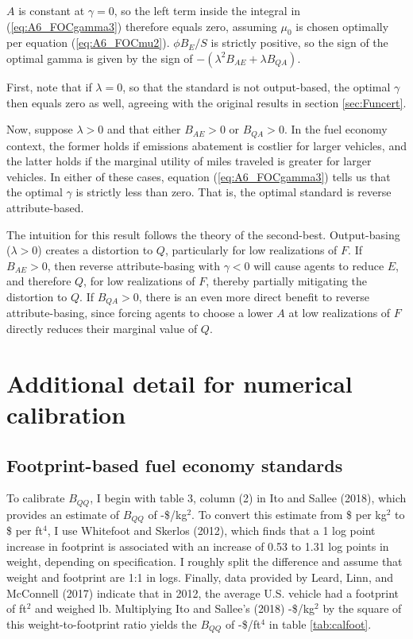 \documentclass[12pt]{article}
\begin{document}
$A$ is constant at $\gamma=0$, so the left term inside the integral in (\ref{eq:A6_FOCgamma3}) therefore equals zero, assuming $\mu_0$ is chosen optimally per equation (\ref{eq:A6_FOCmu2}). $\phi B_E / S$ is strictly positive, so the sign of the optimal gamma is given by the sign of $-(\lambda^2B_{AE}+\lambda B_{QA})$.

First, note that if $\lambda=0$, so that the standard is not output-based, the optimal $\gamma$ then equals zero as well, agreeing with the original results in section \ref{sec:Funcert}.

Now, suppose $\lambda>0$ and that either $B_{AE}>0$ or $B_{QA}>0$. In the fuel economy context, the former holds if emissions abatement is costlier for larger vehicles, and the latter holds if the marginal utility of miles traveled is greater for larger vehicles. In either of these cases, equation (\ref{eq:A6_FOCgamma3}) tells us that the optimal $\gamma$ is strictly less than zero. That is, the optimal standard is reverse attribute-based.

The intuition for this result follows the theory of the second-best. Output-basing ($\lambda>0$) creates a distortion to $Q$, particularly for low realizations of $F$. If $B_{AE}>0$, then reverse attribute-basing with $\gamma<0$ will cause agents to reduce $E$, and therefore $Q$, for low realizations of $F$, thereby partially mitigating the distortion to $Q$. If $B_{QA}>0$, there is an even more direct benefit to reverse attribute-basing, since forcing agents to choose a lower $A$ at low realizations of $F$ directly reduces their marginal value of $Q$.





\newpage
\section{Additional detail for numerical calibration} \label{appx:cal}

\subsection{Footprint-based fuel economy standards} \label{appx:foot}

To calibrate $B_{QQ}$, I begin with table 3, column (2) in Ito and Sallee (2018), which provides an estimate of $B_{QQ}$ of -\$\unskip /kg$^2$. To convert this estimate from \$ per kg$^2$ to \$ per ft$^4$, I use Whitefoot and Skerlos (2012), which finds that a 1 log point increase in footprint is associated with an increase of 0.53 to 1.31 log points in weight, depending on specification. I roughly split the difference and assume that weight and footprint are 1:1 in logs. Finally, data provided by Leard, Linn, and McConnell (2017) indicate that in 2012, the average U.S. vehicle had a footprint of ft$^2$ and weighed lb. Multiplying Ito and Sallee's (2018) -\$\unskip /kg$^2$ by the square of this weight-to-footprint ratio yields the $B_{QQ}$ of -\$\unskip /ft$^4$ in table \ref{tab:calfoot}. 
\end{document}
